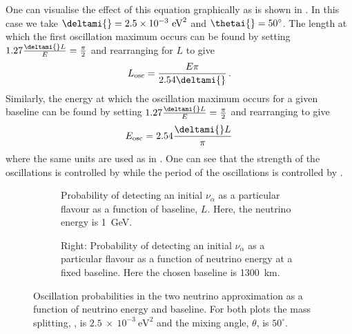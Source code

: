 One can visualise the effect of this equation graphically as is shown in . 
In this case we take $\deltami{} = 2.5 \times 10^{-3}~\text{eV}^{2}$ and $\thetai{} = 50^{\circ}$.
The length at which the first oscillation maximum occurs can be found by setting $1.27 \frac{\deltami{}L}{E} = \frac{\pi}{2}$ and rearranging for $L$ to give
\begin{equation}
  L_{\text{osc}} = \frac{E \pi}{2.54 \deltami{}} \, .
\end{equation}
Similarly, the energy at which the oscillation maximum occurs for a given baseline can be found by setting $1.27 \frac{\deltami{}L}{E} = \frac{\pi}{2}$ and rearranging to give
\begin{equation}
  E_{\text{osc}} = 2.54 \frac{\deltami{} L}{\pi} \,
\end{equation}
where the same units are used as in .
One can see that the strength of the oscillations is controlled by \sstwothetai{} while the period of the oscillations is controlled by \deltami{}.

\begin{figure}[h]
  \centering
  \begin{subfigure}[t]{0.49\textwidth}
    \begin{adjustbox}{max totalsize={\textwidth}, center}
      
    \end{adjustbox}
    \caption{Probability of detecting an initial $\nu_{\alpha}$ as a particular flavour as a function of baseline, $L$. Here, the neutrino energy is \SI{1}{\GeV}.}
  \end{subfigure}
  \hfill
  \begin{subfigure}[t]{0.49\textwidth}
    \begin{adjustbox}{max totalsize={\textwidth}, center}
      
    \end{adjustbox}
    \caption{Right: Probability of detecting an initial $\nu_{\alpha}$ as a particular flavour as a function of neutrino energy at a fixed baseline. Here the chosen baseline is 1300~km.}
  \end{subfigure}
  \caption[Two neutrino vacuum oscillation probabilities.]{Oscillation probabilities in the two neutrino approximation as a function of neutrino energy and baseline. For both plots the mass splitting, \deltami{}, is $2.5~\times~10^{-3}~\text{eV}^{2}$ and the mixing angle, $\theta$, is $50^{\circ}$.}
  \label{fig:twoNeutrino}
\end{figure}

